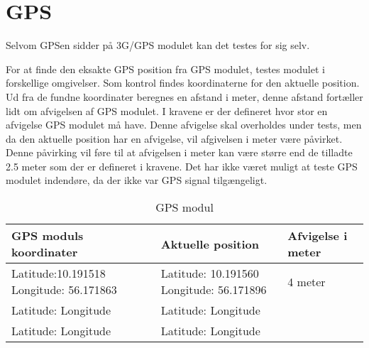 \section{GPS}

Selvom GPSen sidder på 3G/GPS modulet kan det testes for sig selv. 

For at finde den eksakte GPS position fra GPS modulet, testes modulet i forskellige omgivelser. Som kontrol findes koordinaterne for den aktuelle position. Ud fra de fundne koordinater beregnes en afstand i meter, denne afstand fortæller lidt om afvigelsen af GPS modulet. I kravene er der defineret hvor stor en afvigelse GPS modulet må have. Denne afvigelse skal overholdes under tests, men da den aktuelle position har en afvigelse, vil afgivelsen i meter være påvirket. Denne påvirking vil føre til at afvigelsen i meter kan være større end de tilladte 2.5 meter som der er defineret i kravene.
Det har ikke været muligt at teste GPS modulet indendøre, da der ikke var GPS signal tilgængeligt. 

\begin{table}[H]
\begin{tabular}{| p{4cm}| p{4cm}| p{3cm}|}
\hline
GPS moduls koordinater & Aktuelle position & Afvigelse i meter\\\hline
Latitude:10.191518 \newline Longitude: 56.171863 & Latitude: 10.191560 \newline Longitude: 56.171896 & 4 meter\\\hline
Latitude: \newline Longitude & Latitude: \newline Longitude & \\\hline
Latitude: \newline Longitude & Latitude: \newline Longitude & \\\hline

\end{tabular}
\caption{GPS modul}
\label{tab:GPS_modul}
\end{table}

